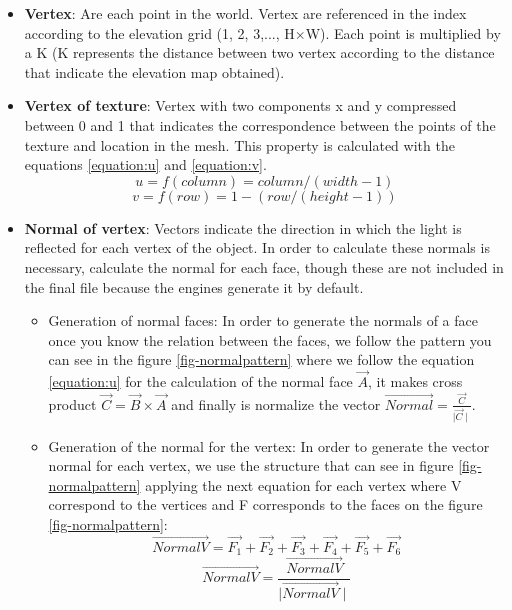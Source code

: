 \documentclass[10pt,a4paper,twocolumn,twoside]{article}
\begin{document}
\begin{itemize}
\setlength\itemsep{0em}
  \item \textbf{Vertex}: Are each point in the world. Vertex are referenced in the index according to the elevation grid (1, 2, 3,..., H$\times$W). Each point is multiplied by a K (K represents the distance between two vertex according to the distance that indicate the elevation map obtained).

  \item {
    \textbf{Vertex of texture}: Vertex with two components x and y compressed between 0 and 1 that indicates the correspondence between the points of the texture and location in the mesh. This property is calculated with the equations \ref{equation:u} and \ref{equation:v}.
    \begin{equation}
    \label{equation:u}
    u = f(column) = column / (width - 1)
    \end{equation}
    \begin{equation}
    \label{equation:v}
    v = f(row) = 1 - (row / (height - 1))
    \end{equation}
  }

\vspace{-0.5cm}
  \item \textbf{Normal of vertex}: Vectors indicate the direction in which the light is reflected for each vertex of the object. In order to calculate these normals is necessary, calculate the normal for each face, though these are not included in the final file because the engines generate it by default.

  \begin{itemize}
  \setlength\itemsep{0em}
    \item {
      Generation of normal faces: In order to generate the normals of a face once you know the relation between the faces, we follow the pattern you can see in the figure \ref{fig-normalpattern} where we follow the equation \ref{equation:u} for the calculation of the normal face $\vec{A}$, it makes cross product $\vec{C} = \vec{B}\times\vec{A}$ and finally is normalize the vector $\vec{Normal} = \frac{\vec{C}}{\mid\vec{C}\mid}$.
    }

    \item {
    Generation of the normal for the vertex: In order to generate the vector normal for each vertex, we use the structure that can see in figure \ref{fig-normalpattern} applying the next equation for each vertex where V correspond to the vertices and F corresponds to the faces on the figure \ref{fig-normalpattern}:
      \begin{equation}
      \vec{NormalV} = \vec{F_1} + \vec{F_2} + \vec{F_3} + \vec{F_4} + \vec{F_5} + \vec{F_6}
      \end{equation}
      \begin{equation}
      \vec{NormalV} = \frac{\vec{NormalV}}{\mid\vec{NormalV}\mid}
      \end{equation}
    }
  \end{itemize}


\end{itemize}
\end{document}
